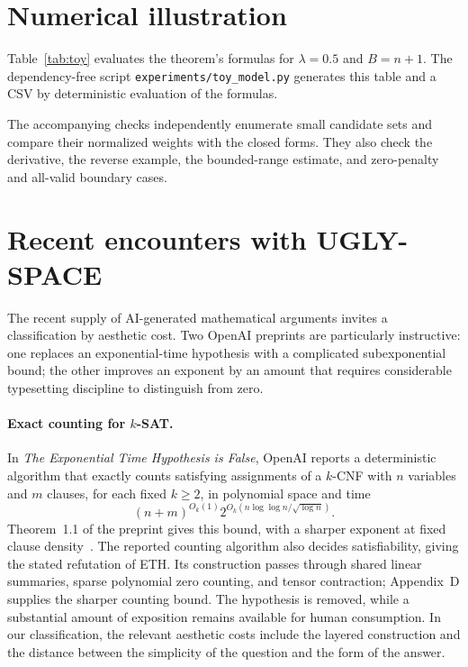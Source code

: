\documentclass[11pt]{article}
\theoremstyle{remark}
\begin{document}
\section{Numerical illustration}\label{sec:numerical}

Table~\ref{tab:toy} evaluates the theorem's formulas for $\lambda=0.5$ and
$B=n+1$. The dependency-free script \texttt{experiments/toy\_model.py}
generates this table and a CSV by deterministic evaluation of the formulas.

\begin{table}[ht]
\centering

\caption{Constructed ugly-solution instances. $H=q_{0.5}$ and $M=q_0$.
Times count verifier calls; success columns use $B=n+1$. Values are rounded.}
\label{tab:toy}
\end{table}

The accompanying checks independently enumerate small candidate sets and
compare their normalized weights with the closed forms. They also check
the derivative, the reverse example, the bounded-range estimate, and
zero-penalty and all-valid boundary cases.

\section{Recent encounters with UGLY-SPACE}\label{sec:encounters}

The recent supply of AI-generated mathematical arguments invites a
classification by aesthetic cost. Two OpenAI preprints are particularly
instructive: one replaces an exponential-time hypothesis with a complicated
subexponential bound; the other improves an exponent by an amount that
requires considerable typesetting discipline to distinguish from zero.

\paragraph{Exact counting for $k$-SAT.}
In \emph{The Exponential Time Hypothesis is False}, OpenAI reports a
deterministic algorithm that exactly counts satisfying assignments of a
$k$-CNF with $n$ variables and $m$ clauses, for each fixed $k\geq2$, in
polynomial space and time
\[
 (n+m)^{O_k(1)}
 2^{O_k\!\left(n\log\log n/\sqrt{\log n}\right)}.
\]
Theorem~1.1 of the preprint gives this bound, with a sharper exponent at
fixed clause density~\cite{openai2026eth}. The reported counting algorithm
also decides satisfiability, giving the stated refutation of ETH. Its
construction passes through shared linear summaries, sparse polynomial
zero counting, and tensor contraction; Appendix~D supplies the sharper
counting bound. The hypothesis is removed, while a substantial amount of
exposition remains available for human consumption. In our classification,
the relevant aesthetic costs include the layered construction and the
distance between the simplicity of the question and the form of the answer.
\end{document}

